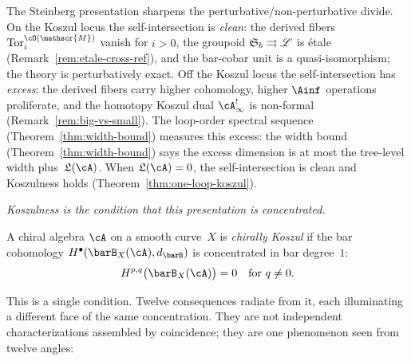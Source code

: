 \begin{remark}
\label{rem:steinberg-perturbative}
The Steinberg presentation sharpens the perturbative/non-perturbative
divide. On the Koszul locus the self-intersection is \emph{clean}:
the derived fibers $\operatorname{Tor}^{\cO(\mathscr{M})}_i$
vanish for $i > 0$, the groupoid $\mathfrak{S}_b \rightrightarrows
\mathscr{L}$ is \'etale
(Remark~\ref{rem:etale-cross-ref}), and the bar-cobar unit is a
quasi-isomorphism; the theory is perturbatively exact.
Off the Koszul locus the self-intersection has \emph{excess}: the
derived fibers carry higher cohomology, higher $\Ainf$ operations
proliferate, and the homotopy Koszul dual $\cA^!_\infty$ is non-formal
(Remark~\ref{rem:big-vs-small}).
The loop-order spectral sequence
(Theorem~\ref{thm:width-bound}) measures this excess:
the width bound (Theorem~\ref{thm:width-bound}) says the
excess dimension is at most the tree-level width
plus~$\mathfrak{L}(\cA)$. When $\mathfrak{L}(\cA) = 0$, the
self-intersection is clean and Koszulness holds
(Theorem~\ref{thm:one-loop-koszul}).
\end{remark}

\emph{Koszulness is the condition that this presentation is
concentrated.}

\begin{definition}
\label{def:chiral-koszul-geometric}
A chiral algebra $\cA$ on a smooth curve~$X$ is
\emph{chirally Koszul} if the bar cohomology
$H^\bullet(\barB_X(\cA), d_{\barB})$ is concentrated in bar
degree~$1$:
\begin{equation}\label{eq:koszul-concentration}
H^{p,q}\bigl(\barB_X(\cA)\bigr) = 0 \quad
\text{for } q \neq 0.
\end{equation}
\end{definition}

This is a single condition. Twelve consequences radiate from it, each
illuminating a different face of the same concentration. They are not
independent characterizations assembled by coincidence; they are one
phenomenon seen from twelve angles:


